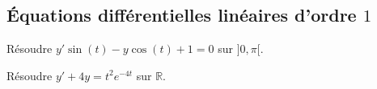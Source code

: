 \documentclass[a4paper,twoside,french,11pt]{VcCours}
\begin{document}

\tableofcontents
\separationTitre


\subsection{Équations différentielles linéaires d'ordre \texorpdfstring{$1$}{1}}


\begin{Exercice}{} Résoudre $y' \sin(t)-y \cos(t)+1=0$ sur $]0,\pi[$.
\end{Exercice}


\begin{Exercice}{} Résoudre $y'+4y = t^2 e^{-4t}$ sur $\mathbb{R}$. 
\end{Exercice}

\end{document}
